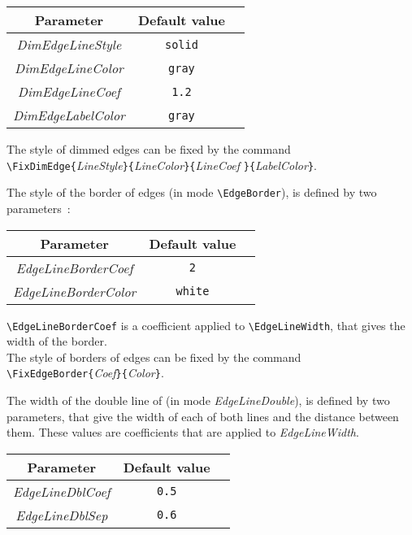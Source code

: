 \documentclass[11pt,twoside]{article}
\begin{document}
\begin{center}
\begin{tabular}{c|c|c|}
Parameter & Default value\\
\hline
\textit{DimEdgeLineStyle} & \texttt{solid} \\
\hline
\textit{DimEdgeLineColor} & \texttt{gray} \\
\hline
\textit{DimEdgeLineCoef} & \texttt{1.2} \\
\hline
\textit{DimEdgeLabelColor} & \texttt{gray}\\
\hline
\end{tabular}
\end{center}

The style of dimmed edges can be fixed by the command
\\\verb+\FixDimEdge{+\textit{LineStyle}\verb+}{+\textit{LineColor}\verb+}{+\textit{LineCoef}%
\verb+}{+\textit{LabelColor}\verb+}+.
\medskip

The style of the border of edges (in mode \verb+\EdgeBorder+),
is defined by two parameters~:
\begin{center}
\begin{tabular}{c|c|c|}
Parameter & Default value\\
\hline
\textsl{EdgeLineBorderCoef} & \texttt{2} \\
\hline
\textsl{EdgeLineBorderColor} & \texttt{white} \\
\hline
\end{tabular}
\end{center}

\verb+\EdgeLineBorderCoef+ is a coefficient applied to \verb+\EdgeLineWidth+,
that gives the width of the border.\\The style of borders of edges can
be fixed by the command \verb+\FixEdgeBorder{+\textsl{Coef}\verb+}{+\textsl{Color}\texttt{\}}.
\medskip

The width of the double line of (in mode \textsl{EdgeLineDouble}),
is defined by two parameters, that give the width of each of both lines
and the distance between them. These values are coefficients that are
applied to \textsl{EdgeLineWidth}.

\begin{center}
\begin{tabular}{c|c|c|}
Parameter & Default value\\
\hline
\textsl{EdgeLineDblCoef} & \texttt{0.5} \\
\hline
\textsl{EdgeLineDblSep} & \texttt{0.6} \\
\hline
\end{tabular}
\end{center}
\end{document}
